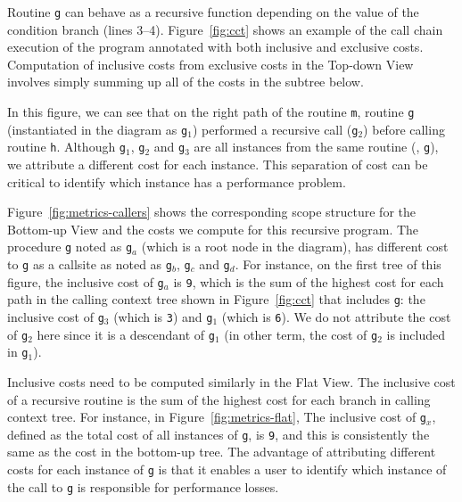 Routine \texttt{g} can behave as a recursive function depending on the value of the condition branch (lines 3--4).
Figure~\ref{fig:cct} shows an example of the call chain execution of the program annotated with both inclusive and exclusive costs.
Computation of inclusive costs from exclusive costs in the Top-down View involves simply summing up all of the costs in the subtree below.

In this figure, we can see that on the right path of the routine \texttt{m}, routine \texttt{g} (instantiated in the diagram as \texttt{g$_1$}) performed a recursive call (\texttt{g$_2$}) before calling routine \texttt{h}.
Although \texttt{g$_1$}, \texttt{g$_2$} and \texttt{g$_3$} are all instances from the same routine (\ie{}, \texttt{g}), we attribute a different cost for each instance.
This separation of cost can be critical to identify which instance has a performance problem.

Figure~\ref{fig:metrics-callers} shows the corresponding scope structure for the Bottom-up View and the costs we compute for this recursive program.
The procedure \texttt{g} noted as \texttt{g$_a$} (which is a root node in the diagram), has different cost to \texttt{g} as a callsite as noted as \texttt{g$_b$}, \texttt{g$_c$} and \texttt{g$_d$}.
For instance, on the first tree of this figure, the inclusive cost of \texttt{g$_a$} is \texttt{9}, which is the sum of the highest cost for each path in the calling context tree shown in Figure~\ref{fig:cct} that includes \texttt{g}: the inclusive cost of \texttt{g$_3$} (which is \texttt{3}) and \texttt{g$_1$} (which is \texttt{6}).
We do not attribute the cost of \texttt{g$_2$} here since it is a descendant of \texttt{g$_1$} (in other term, the cost of \texttt{g$_2$} is included in \texttt{g$_1$}).

Inclusive costs need to be computed similarly in the Flat View.
The inclusive cost of a recursive routine is the sum of the highest cost for each branch in calling context tree.
For instance, in Figure~\ref{fig:metrics-flat}, The inclusive cost of \texttt{g$_x$}, defined as the total cost of all instances of \texttt{g}, is \texttt{9}, and this is consistently the same as the cost in the bottom-up tree.
The advantage of attributing different costs for each instance of \texttt{g} is that it enables a user to identify which instance of the call to \texttt{g} is responsible for performance losses.



